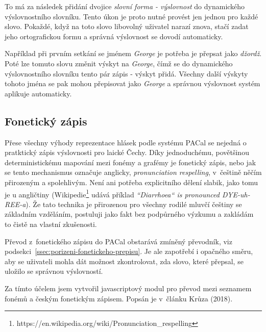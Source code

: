 To má za následek přidání dvojice {\em slovní forma - výslovnost} do dynamického
výslovnostního slovníku. Tento úkon je proto nutné provést jen jednou pro každé
slovo. Pokaždé, když na toto slovo libovolný uživatel narazí znova, stačí zadat jeho
ortografickou formu a správná výslovnost se dovodí automaticky.

Například při prvním setkání se jménem {\em George} je potřeba je přepsat jako
{\em džordž}. Poté lze tomuto slovu změnit výskyt na {\em George}, čímž se do
dynamického výslovnostního slovníku tento pár zápis - výskyt přidá. Všechny
další výskyty tohoto jména se pak mohou přepisovat jako {\em George} a správnou
výslovnost systém aplikuje automaticky.

\subsection{Fonetický zápis}
\label{ssec:respelling}

Přese všechny výhody reprezentace hlásek podle systému PACal se nejedná o
pratktický zápis výslovnosti pro laické Čechy. Díky jednoduchému, povětšinou
deterministickému mapování mezi fonémy a grafémy je fonetický zápis, nebo jak
se tento mechanismus označuje anglicky, {\em pronunciation respelling},
v~češtině něčím přirozeným a spolehlivým. Není ani potřeba explicitního dělení
slabik, jako tomu je u angličtiny
(Wikipedie\footnote{https://en.wikipedia.org/wiki/Pronunciation\_respelling}
udává příklad {\em ``Diarrhoea`` is pronounced DYE-uh-REE-a}).
Že tato technika je přirozenou pro všechny rodilé mluvčí češtiny se základním vzděláním,
postuluji jako fakt bez podpůrného výzkumu a zakládám to čistě na vlastní
zkušenosti.

Převod z~fonetického zápisu do PACal obstarává zmíněný převodník, viz
podsekci~\ref{ssec:porizeni-fonetickeho-prepisu}. Je ale zapotřebí i opačného
směru, aby se uživateli mohla dát možnost zkontrolovat, zda slovo, které
přepsal, se uložilo se správnou výslovností.

Za tímto účelem jsem vytvořil javascriptový modul pro převod mezi seznamem
fonémů a českým fonetickým zápisem. Popsán je v~článku Krůza (2018)\cite{biblio:KrPhoneticTranscription2018}.

